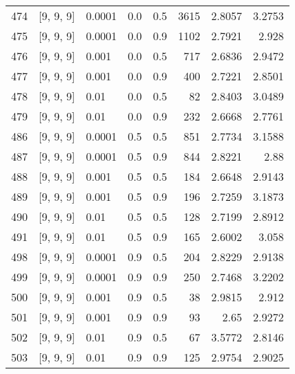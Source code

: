 \begin{longtable}{lllrrrrr}
  474 &          [9, 9, 9] &                      0.0001 &      0.0 & 0.5 & 3615 &   2.8057 &   3.2753 \\
  475 &          [9, 9, 9] &                      0.0001 &      0.0 & 0.9 & 1102 &   2.7921 &    2.928 \\
  476 &          [9, 9, 9] &                       0.001 &      0.0 & 0.5 &  717 &   2.6836 &   2.9472 \\
  477 &          [9, 9, 9] &                       0.001 &      0.0 & 0.9 &  400 &   2.7221 &   2.8501 \\
  478 &          [9, 9, 9] &                        0.01 &      0.0 & 0.5 &   82 &   2.8403 &   3.0489 \\
  479 &          [9, 9, 9] &                        0.01 &      0.0 & 0.9 &  232 &   2.6668 &   2.7761 \\
  486 &          [9, 9, 9] &                      0.0001 &      0.5 & 0.5 &  851 &   2.7734 &   3.1588 \\
  487 &          [9, 9, 9] &                      0.0001 &      0.5 & 0.9 &  844 &   2.8221 &     2.88 \\
  488 &          [9, 9, 9] &                       0.001 &      0.5 & 0.5 &  184 &   2.6648 &   2.9143 \\
  489 &          [9, 9, 9] &                       0.001 &      0.5 & 0.9 &  196 &   2.7259 &   3.1873 \\
  490 &          [9, 9, 9] &                        0.01 &      0.5 & 0.5 &  128 &   2.7199 &   2.8912 \\
  491 &          [9, 9, 9] &                        0.01 &      0.5 & 0.9 &  165 &   2.6002 &    3.058 \\
  498 &          [9, 9, 9] &                      0.0001 &      0.9 & 0.5 &  204 &   2.8229 &   2.9138 \\
  499 &          [9, 9, 9] &                      0.0001 &      0.9 & 0.9 &  250 &   2.7468 &   3.2202 \\
  500 &          [9, 9, 9] &                       0.001 &      0.9 & 0.5 &   38 &   2.9815 &    2.912 \\
  501 &          [9, 9, 9] &                       0.001 &      0.9 & 0.9 &   93 &     2.65 &   2.9272 \\
  502 &          [9, 9, 9] &                        0.01 &      0.9 & 0.5 &   67 &   3.5772 &   2.8146 \\
  503 &          [9, 9, 9] &                        0.01 &      0.9 & 0.9 &  125 &   2.9754 &   2.9025 \\

\end{longtable}
